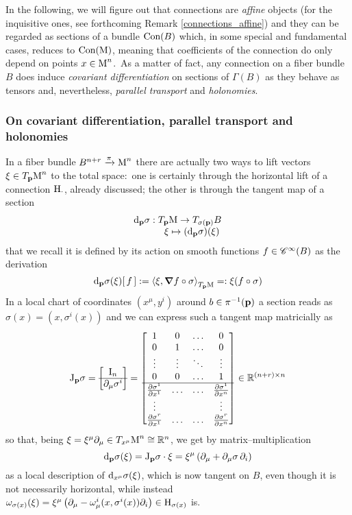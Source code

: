 \newpage
In the following, we will figure out that connections are \emph{affine} objects (for the inquisitive ones, see forthcoming Remark \ref{connections_affine}) and they can be regarded as sections of a bundle $\text{\normalfont Con}(B)$ which, in some special and fundamental cases, reduces to $\text{\normalfont Con}(\text{\normalfont M})$, meaning that coefficients of the connection do only depend on points $x\in\text{\normalfont M}^n$.\, As a matter of fact, any connection on a fiber bundle $B$ does induce \emph{covariant differentiation} on sections of $\Gamma(B)$ as they behave as tensors and, nevertheless, \emph{parallel transport} and \emph{holonomies}.

\subsubsection{On covariant differentiation, parallel transport and holonomies}

In a fiber bundle $B^{n+r}\xrightarrow{\pi}\text{\normalfont M}^n$ there are actually two ways to lift vectors $\xi\in T_{\mathbf{p}}\text{\normalfont M}^n$ to the total space:\, one is certainly through the horizontal lift of a connection $\text{\normalfont H}_\cdot$, already discussed; the other is through the tangent map of a section 
$$\begin{matrix}
    \text{\normalfont d}_{\mathbf{p}}\sigma:T_{\mathbf{p}}\text{\normalfont M}\to T_{\sigma(\mathbf{p})}B\\
    \qquad\quad\xi\mapsto(\text{\normalfont d}_{\mathbf{p}}\sigma)(\xi)
\end{matrix}$$
that we recall it is defined by its action on smooth functions $f\in\mathscr{C}^\infty(B)$ as the derivation
$$\text{\normalfont d}_{\mathbf{p}}\sigma(\xi)[\,f\,]:=\left\langle\xi,\grad f\circ\sigma\right\rangle_{T_{\mathbf{p}}\text{\normalfont M}}=:\xi(f\circ\sigma)$$
In a local chart of coordinates $(x^\mu,y^i)$ around $b\in\pi^{-1}(\mathbf{p})$ a section reads as $\sigma(x)=\left(x,\sigma^i(x)\right)$ and we can express such a tangent map matricially as
$$\text{\normalfont J}_{\mathbf{p}}\sigma=\begin{bmatrix}
    \text{\normalfont I}_n\\
    \hline
    \partial_\mu\sigma^i
\end{bmatrix}=\begin{bmatrix}
    1&0&\hdots&0\\
    0&1&\hdots&0\\
    \vdots&\vdots&\ddots&\vdots\\
    0&0&\hdots&1\\
    \hline
    \frac{\partial\sigma^1}{\partial x^1}&\hdots&\hdots&\frac{\partial\sigma^1}{\partial x^n}\\
    \vdots&\,&\,&\vdots\\
    \frac{\partial\sigma^r}{\partial x^1}&\hdots&\hdots&\frac{\partial\sigma^r}{\partial x^n}
\end{bmatrix}\in\mathbb{R}^{(n+r)\times n}$$
so that, being $\xi=\xi^\mu\partial_\mu\in T_{x^\mu}\text{\normalfont M}^n\cong\mathbb{R}^n$, we get by matrix--multiplication
$$\text{\normalfont d}_{\mathbf{p}}\sigma(\xi)=\text{\normalfont J}_{\mathbf{p}}\sigma\cdot\xi=\xi^\mu\left(\partial_\mu+\partial_\mu\sigma\,\partial_i\right)$$ 
as a local description of $\text{\normalfont d}_{x^\mu}\sigma(\xi)$, which is now tangent on $B$, even though it is not necessarily horizontal, while instead $\omega_{\sigma(x)}(\xi)=\xi^\mu\left(\partial_\mu-\omega^i_\mu(x,\sigma^i(x))\partial_i\right)\in\text{\normalfont H}_{\sigma(x)}$ is.


